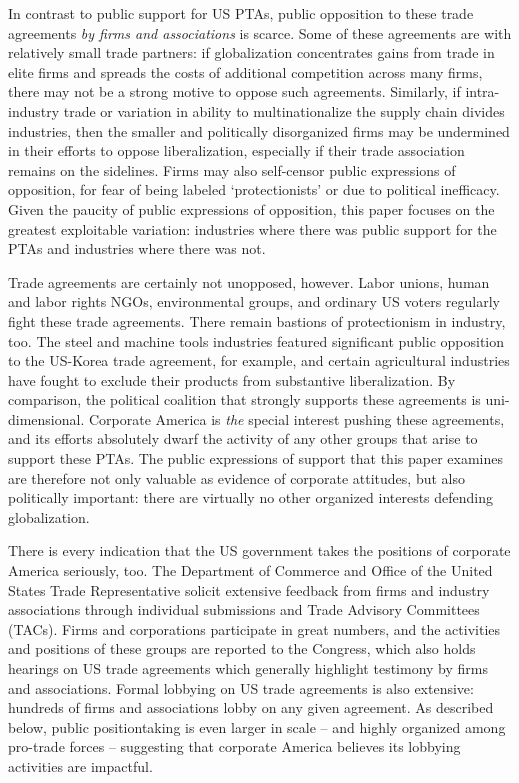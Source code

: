 \documentclass[hidelinks,12pt,letter]{article}
\begin{document}
In contrast to public support for US PTAs, public opposition to these trade agreements \textit{by firms and associations} is scarce. Some of these agreements are with relatively small trade partners: if globalization concentrates gains from trade in elite firms and spreads the costs of additional competition across many firms, there may not be a strong motive to oppose such agreements. Similarly, if intra-industry trade or variation in ability to multinationalize the supply chain divides industries, then the smaller and politically disorganized firms may be undermined in their efforts to oppose liberalization, especially if their trade association remains on the sidelines. Firms may also self-censor public expressions of opposition, for fear of being labeled `protectionists' or due to political inefficacy. Given the paucity of public expressions of opposition, this paper focuses on the greatest exploitable variation: industries where there was public support for the PTAs and industries where there was not. 

Trade agreements are certainly not unopposed, however. Labor unions, human and labor rights NGOs, environmental groups, and ordinary US voters regularly fight these trade agreements. %
There remain bastions of protectionism in industry, too. The steel and machine tools industries featured significant public opposition to the US-Korea trade agreement, for example, and certain agricultural industries have fought to exclude their products from substantive liberalization. By comparison, the political coalition that strongly supports these agreements is uni-dimensional. Corporate America is \textit{the} special interest pushing these agreements, and its efforts absolutely dwarf the activity of any other groups that arise to support these PTAs. The public expressions of support that this paper examines are therefore not only valuable as evidence of corporate attitudes, but also politically important: there are virtually no other organized interests defending globalization.

There is every indication that the US government takes the positions of corporate America seriously, too. The Department of Commerce and Office of the United States Trade Representative solicit extensive feedback from firms and industry associations through individual submissions and Trade Advisory Committees (TACs). Firms and corporations participate in great numbers, and the activities and positions of these groups are reported to the Congress, which also holds hearings on US trade agreements which generally highlight testimony by firms and associations. Formal lobbying on US trade agreements is also extensive: hundreds of firms and associations lobby on any given agreement. As described below, public positiontaking is even larger in scale -- and highly organized among pro-trade forces -- suggesting that corporate America believes its lobbying activities are impactful.
\end{document}
